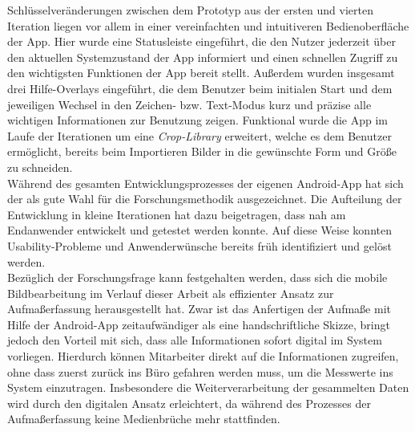 Schlüsselveränderungen zwischen dem Prototyp aus der ersten und vierten Iteration liegen vor allem in einer vereinfachten und intuitiveren Bedienoberfläche der App.
Hier wurde eine Statusleiste eingeführt, die den Nutzer jederzeit über den aktuellen Systemzustand der App informiert und einen schnellen Zugriff zu den wichtigsten Funktionen der App bereit stellt.
Außerdem wurden insgesamt drei Hilfe-Overlays eingeführt, die dem Benutzer beim initialen Start und dem jeweiligen Wechsel in den Zeichen- bzw. Text-Modus kurz und präzise alle wichtigen Informationen zur Benutzung zeigen.
Funktional wurde die App im Laufe der Iterationen um eine \emph{Crop-Library} erweitert, welche es dem Benutzer ermöglicht, bereits beim Importieren Bilder in die gewünschte Form und Größe zu schneiden. \\

Während des gesamten Entwicklungsprozesses der eigenen Android-App hat sich der \hcdp{} als gute Wahl für die Forschungsmethodik ausgezeichnet.
Die Aufteilung der Entwicklung in kleine Iterationen hat dazu beigetragen, dass nah am Endanwender entwickelt und getestet werden konnte.
Auf diese Weise konnten Usability-Probleme und Anwenderwünsche bereits früh identifiziert und gelöst werden. \\

Bezüglich der Forschungsfrage kann festgehalten werden, dass sich die mobile Bildbearbeitung im Verlauf dieser Arbeit als effizienter Ansatz zur Aufmaßerfassung herausgestellt hat.
Zwar ist das Anfertigen der Aufmaße mit Hilfe der Android-App zeitaufwändiger als eine handschriftliche Skizze, bringt jedoch den Vorteil mit sich, dass alle Informationen sofort digital im System vorliegen.
Hierdurch können Mitarbeiter direkt auf die Informationen zugreifen, ohne dass zuerst zurück ins Büro gefahren werden muss, um die Messwerte ins System einzutragen.
Insbesondere die Weiterverarbeitung der gesammelten Daten wird durch den digitalen Ansatz erleichtert, da während des Prozesses der Aufmaßerfassung keine Medienbrüche mehr stattfinden. 

